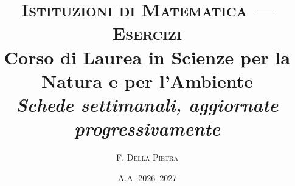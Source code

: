 \documentclass[11pt,a4paper,fleqn,oneside,a4paper,usenames,dvipsnames,linedheaders]
{book}
\theoremstyle{definition}
\theoremstyle{definition}
\theoremstyle{plain}
\numberwithin{equation}{chapter}
\newcounter{es}
\begin{document}
\pagestyle{mystyle}
\title{\large\textsc{Istituzioni di Matematica --- Esercizi} \\[.2cm] \normalsize Corso di Laurea in Scienze per la Natura e per l'Ambiente \\[.3cm] \textit{Schede settimanali, aggiornate progressivamente}}
\author{\normalsize \textsc{F. Della Pietra}}
\date{A.A. 2026--2027}

\maketitle

\tableofcontents


\end{document}
